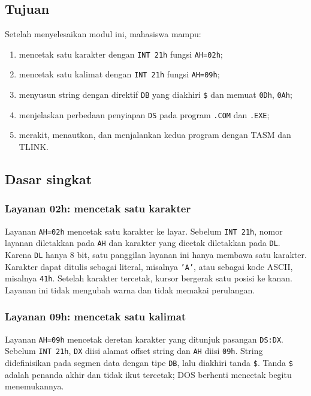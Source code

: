 
\subsection{Tujuan}

\begin{tujuan}
Setelah menyelesaikan modul ini, mahasiswa mampu:
\begin{enumerate}
    \item mencetak satu karakter dengan \texttt{INT 21h} fungsi
          \texttt{AH=02h};
    \item mencetak satu kalimat dengan \texttt{INT 21h} fungsi
          \texttt{AH=09h};
    \item menyusun string dengan direktif \texttt{DB} yang diakhiri
          \texttt{\$} dan memuat \texttt{0Dh}, \texttt{0Ah};
    \item menjelaskan perbedaan penyiapan \texttt{DS} pada program
          \texttt{.COM} dan \texttt{.EXE};
    \item merakit, menautkan, dan menjalankan kedua program dengan
          TASM dan TLINK.
\end{enumerate}
\end{tujuan}

\subsection{Dasar singkat}

\subsubsection*{Layanan 02h: mencetak satu karakter}

Layanan \texttt{AH=02h} mencetak satu karakter ke layar. Sebelum
\texttt{INT 21h}, nomor layanan diletakkan pada \texttt{AH} dan
karakter yang dicetak diletakkan pada \texttt{DL}. Karena
\texttt{DL} hanya 8 bit, satu panggilan layanan ini hanya membawa
satu karakter. Karakter dapat ditulis sebagai literal, misalnya
\texttt{'A'}, atau sebagai kode ASCII, misalnya \texttt{41h}.
Setelah karakter tercetak, kursor bergerak satu posisi ke kanan.
Layanan ini tidak mengubah warna dan tidak memakai perulangan.

\subsubsection*{Layanan 09h: mencetak satu kalimat}

Layanan \texttt{AH=09h} mencetak deretan karakter yang ditunjuk
pasangan \texttt{DS:DX}. Sebelum \texttt{INT 21h}, \texttt{DX} diisi
alamat offset string dan \texttt{AH} diisi \texttt{09h}. String
didefinisikan pada segmen data dengan tipe \texttt{DB}, lalu diakhiri
tanda \texttt{\$}. Tanda \texttt{\$} adalah penanda akhir dan tidak
ikut tercetak; DOS berhenti mencetak begitu menemukannya.

